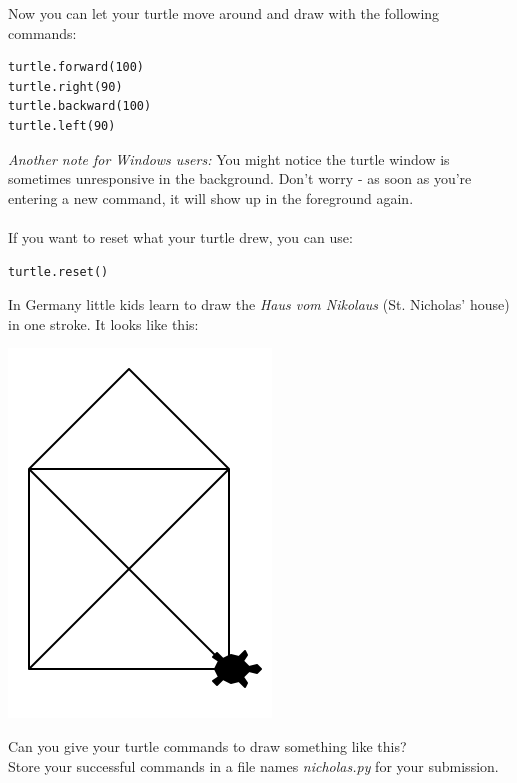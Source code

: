 \documentclass{article}
\begin{document}
Now you can let your turtle move around and draw with the following commands:
\begin{lstlisting}
turtle.forward(100)
turtle.right(90)
turtle.backward(100)
turtle.left(90)
\end{lstlisting}
\textit{Another note for Windows users:} You might notice the turtle window is
sometimes unresponsive in the background. Don't worry - as soon as you're entering
a new command, it will show up in the foreground again.\\\\
If you want to reset what your turtle drew, you can use:
\begin{lstlisting}
turtle.reset()
\end{lstlisting}
In Germany little kids learn to draw the \textit{Haus vom Nikolaus} (St. Nicholas' house)
in one stroke. It looks like this:\\
\begin{center}
\includegraphics[scale=1]{Ex_1_Nicholas}
\end{center}
Can you give your turtle commands to draw something like this?\\
Store your successful commands in a file names \textit{nicholas.py} for your submission.
\end{document}
